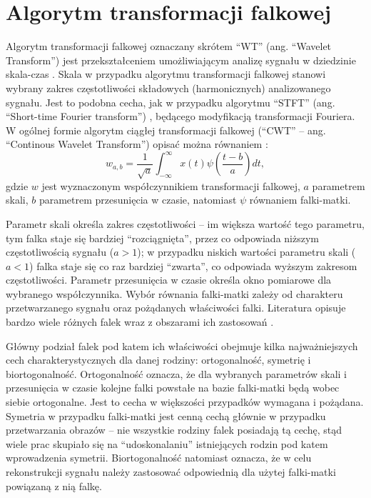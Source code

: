 \chapter{Algorytm transformacji falkowej}

Algorytm transformacji falkowej oznaczany skrótem \enquote{WT} (ang. \enquote{Wavelet Transform}) jest przekształceniem umożliwiającym analizę sygnału w dziedzinie skala-czas \cite{wallen_handbook}. Skala w przypadku algorytmu transformacji falkowej stanowi wybrany zakres częstotliwości składowych (harmonicznych) analizowanego sygnału. Jest to podobna cecha, jak w przypadku algorytmu \enquote{STFT} (ang. \enquote{Short-time Fourier transform}) \cite{durak_sftp}, będącego modyfikacją transformacji Fouriera. W ogólnej formie algorytm ciągłej transformacji falkowej (\enquote{CWT} -- ang. \enquote{Continous Wavelet Transform}) opisać można równaniem \cite{lord_guide, wallen_handbook}:
\begin{equation}
w_{a,b} = \frac{1}{\sqrt{a}} \int _{-\infty} ^{\infty} { x \left( t \right) \psi \left( \frac{t-b}{a} \right) } dt \label{eqn_cwt},
\end{equation}
gdzie $w$ jest wyznaczonym współczynnikiem transformacji falkowej, $a$ parametrem skali, $b$ parametrem przesunięcia w czasie, natomiast $\psi$ równaniem falki-matki.

Parametr skali określa zakres częstotliwości -- im większa wartość tego parametru, tym falka staje się bardziej \enquote{rozciągnięta}, przez co odpowiada niższym częstotliwością sygnału ($a > 1$); w przypadku niskich wartości parametru skali ($a < 1$) falka staje się co raz bardziej \enquote{zwarta}, co odpowiada wyższym zakresom częstotliwości. Parametr przesunięcia w czasie określa okno pomiarowe dla wybranego współczynnika. Wybór równania falki-matki zależy od charakteru przetwarzanego sygnału oraz pożądanych właściwości falki. Literatura opisuje bardzo wiele różnych falek wraz z obszarami ich zastosowań \cite{wallen_handbook, akujuobi_applications}.

Główny podział falek pod katem ich właściwości obejmuje kilka najważniejszych cech charakterystycznych dla danej rodziny: ortogonalność, symetrię i biortogonalność. Ortogonalność oznacza, że dla wybranych parametrów skali i przesunięcia w czasie kolejne falki powstałe na bazie falki-matki będą wobec siebie ortogonalne. Jest to cecha w większości przypadków wymagana i pożądana. Symetria w przypadku falki-matki jest cenną cechą głównie w przypadku przetwarzania obrazów -- nie wszystkie rodziny falek posiadają tą cechę, stąd wiele prac skupiało się na \enquote{udoskonalaniu} istniejących rodzin pod katem wprowadzenia symetrii. Biortogonalność natomiast oznacza, że w celu rekonstrukcji sygnału należy zastosować odpowiednią dla użytej falki-matki powiązaną z nią falkę.

